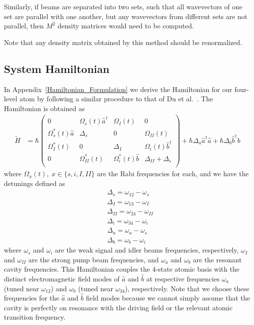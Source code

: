 \documentclass[aps,pra,showpacs,amsmath,amssymb,nofootinbib,longbibliography,superscriptaddress
]{revtex4-1}
\theoremstyle{definition}
\theoremstyle{remark}
\newcommand{\0}{\hat{0}}
\begin{document}
Similarly, if beams are separated into two sets, such that all wavevectors of one set are parallel with one another, but any wavevectors from different sets are not parallel, then $M^2$ density matrices would need to be computed.

Note that any density matrix obtained by this method should be renormalized.

\subsection{System Hamiltonian}\label{HamiltonianPresentation}

In Appendix~\ref{Hamiltonian_Formulation} we derive the Hamiltonian for our four-level atom by following a similar procedure to that of Du et al.~\cite{QuantumInternet}. The Hamiltonian is obtained as
\begin{align}
    \tilde{H}
    &=
    \hbar \left(
        \begin{array}{cccc}
            0 & \Omega_{s}(t) \hat{a}^{\dagger} & \Omega_{I}(t) & 0\\
            \Omega_{s}^*(t) \hat{a} & \Delta_s & 0 & \Omega_{II}(t)\\
            \Omega_{I}^*(t) & 0 & \Delta_I & \Omega_{i}(t) \hat{b}^{\dagger}\\
            0 & \Omega_{II}^*(t) & \Omega_{i}^*(t) \hat{b} & \Delta_{II} + \Delta_s\\
        \end{array}
    \right) +
    \hbar \Delta_a \hat{a}^{\dagger}\hat{a} +
    \hbar \Delta_b  \hat{b}^{\dagger}\hat{b}
\end{align}
where $\Omega_{x}(t),\;x \in \{s,i,I,II\}$ are the Rabi frequencies for each, and we have the detunings defined as
\begin{align}
&\Delta_s = \omega_{12} - \omega_s\\
&\Delta_I = \omega_{13} - \omega_I\\
&\Delta_{II} = \omega_{24} - \omega_{II}\\
&\Delta_i = \omega_{34} - \omega_i\\
&\Delta_a = \omega_a - \omega_s\\
&\Delta_b = \omega_b - \omega_i
\end{align}
where $\omega_s$ and $\omega_i$ are the weak signal and idler beams frequencies, respectively, $\omega_I$ and $\omega_{II}$ are the strong pump beam frequencies, and $\omega_a$ and $\omega_b$ are the resonant cavity frequencies. This Hamiltonian couples the 4-state atomic basis with the distinct electromagnetic field modes of $\hat{a}$ and $\hat{b}$ at respective frequencies $\omega_{a}$ (tuned near $\omega_{12}$) and $\omega_{b}$ (tuned near $\omega_{34}$), respectively. Note that we choose these frequencies for the $\hat{a}$ and $\hat{b}$ field modes because we cannot simply assume that the cavity is perfectly on resonance with the driving field or the relevant atomic transition frequency.
\end{document}
